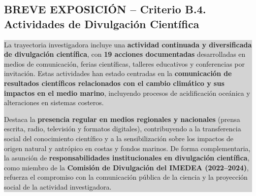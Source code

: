 \documentclass[11pt,a4paper]{article}
\newcommand{\breveexposicion}[2]{
    \subsection*{\color{darkgray}\textbf{BREVE EXPOSICIÓN -- #1}}
    \vspace{0.3em}
    \noindent\colorbox{lightgray}{%
        \begin{minipage}{0.97\textwidth}
        \vspace{0.5em}
        \color{darkgray}
        #2
        \vspace{0.5em}
        \end{minipage}
    }
    \vspace{1em}
}
\begin{document}
\breveexposicion{Criterio B.4. Actividades de Divulgación Científica}{
La trayectoria investigadora incluye una \textbf{actividad continuada y diversificada de divulgación científica}, con \textbf{19 acciones documentadas} desarrolladas en medios de comunicación, ferias científicas, talleres educativos y conferencias por invitación. Estas actividades han estado centradas en la \textbf{comunicación de resultados científicos relacionados con el cambio climático y sus impactos en el medio marino}, incluyendo procesos de acidificación oceánica y alteraciones en sistemas costeros.

Destaca la \textbf{presencia regular en medios regionales y nacionales} (prensa escrita, radio, televisión y formatos digitales), contribuyendo a la transferencia social del conocimiento científico y a la sensibilización sobre los impactos de origen natural y antrópico en costas y fondos marinos. De forma complementaria, la asunción de \textbf{responsabilidades institucionales en divulgación científica}, como miembro de la \textbf{Comisión de Divulgación del IMEDEA (2022--2024)}, refuerza el compromiso con la comunicación pública de la ciencia y la proyección social de la actividad investigadora.
}
\end{document}
